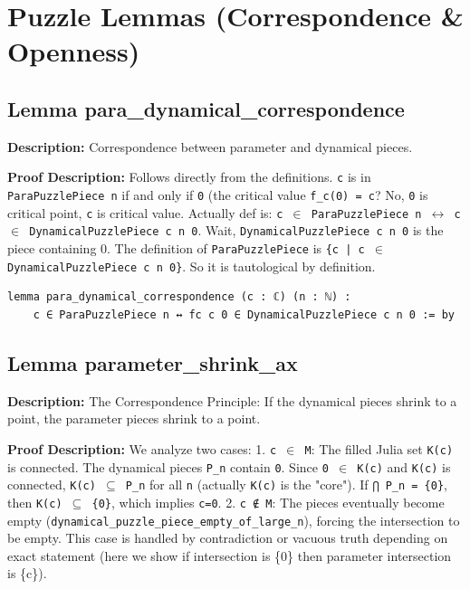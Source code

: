 \section{Puzzle Lemmas (Correspondence \& Openness)}

\subsection*{Lemma para\_dynamical\_correspondence}
\textbf{Description:} Correspondence between parameter and dynamical pieces.

\textbf{Proof Description:} Follows directly from the definitions. \texttt{c} is in \texttt{ParaPuzzlePiece n} if and only if
    \texttt{0} (the critical value \texttt{f\_c(0) = c}? No, \texttt{0} is critical point, \texttt{c} is critical value.
    Actually def is: \texttt{c $\in$ ParaPuzzlePiece n $\leftrightarrow$ c $\in$ DynamicalPuzzlePiece c n 0}.
    Wait, \texttt{DynamicalPuzzlePiece c n 0} is the piece containing 0.
    The definition of \texttt{ParaPuzzlePiece} is \texttt{\{c | c $\in$ DynamicalPuzzlePiece c n 0\}}.
    So it is tautological by definition.

\begin{lstlisting}[language=Lean]
lemma para_dynamical_correspondence (c : ℂ) (n : ℕ) :
    c ∈ ParaPuzzlePiece n ↔ fc c 0 ∈ DynamicalPuzzlePiece c n 0 := by
\end{lstlisting}

\subsection*{Lemma parameter\_shrink\_ax}
\textbf{Description:} The Correspondence Principle:
    If the dynamical pieces shrink to a point, the parameter pieces shrink to a point.

\textbf{Proof Description:} We analyze two cases:
    1.  \texttt{c $\in$ M}: The filled Julia set \texttt{K(c)} is connected. The dynamical pieces \texttt{P\_n} contain \texttt{0}.
        Since \texttt{0 $\in$ K(c)} and \texttt{K(c)} is connected, \texttt{K(c) $\subseteq$ P\_n} for all \texttt{n} (actually \texttt{K(c)} is the "core").
        If \texttt{⋂ P\_n = \{0\}}, then \texttt{K(c) $\subseteq$ \{0\}}, which implies \texttt{c=0}.
    2.  \texttt{c ∉ M}: The pieces eventually become empty (\texttt{dynamical\_puzzle\_piece\_empty\_of\_large\_n}),
        forcing the intersection to be empty. This case is handled by contradiction or vacuous truth
        depending on exact statement (here we show if intersection is \{0\} then parameter intersection is \{c\}).


